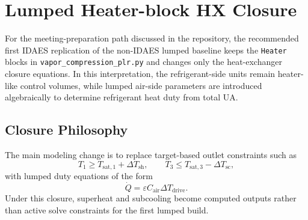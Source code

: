 \documentclass[11pt]{article}
\begin{document}
\section{Lumped Heater-block HX Closure}
For the meeting-preparation path discussed in the repository, the recommended first IDAES replication of the non-IDAES lumped baseline keeps the \texttt{Heater} blocks in \texttt{vapor\_compression\_plr.py} and changes only the heat-exchanger closure equations. In this interpretation, the refrigerant-side units remain heater-like control volumes, while lumped air-side parameters are introduced algebraically to determine refrigerant heat duty from total UA.

\subsection{Closure Philosophy}
The main modeling change is to replace target-based outlet constraints such as
\begin{equation}
T_1 \ge T_{\mathrm{sat},1} + \Delta T_{\mathrm{sh}},
\qquad
T_3 \le T_{\mathrm{sat},3} - \Delta T_{\mathrm{sc}},
\end{equation}
with lumped duty equations of the form
\begin{equation}
\dot{Q} = \varepsilon C_{\mathrm{air}} \Delta T_{\mathrm{drive}}.
\end{equation}
Under this closure, superheat and subcooling become computed outputs rather than active solve constraints for the first lumped build.
\end{document}
